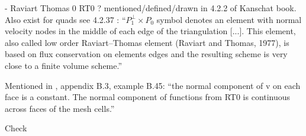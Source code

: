 
- Raviart Thomas 0 RT0 \cite{rath77} ? mentioned/defined/drawn in 4.2.2 of 
Kanschat book. Also exist for quads see 4.2.37 
\textcite{hald03}: ``$P_1^\perp \times P_0$ symbol denotes an element with 
normal velocity nodes in the middle of each edge of the
triangulation [...]. This element, also called low order Raviart–Thomas element 
(Raviart and Thomas, 1977), is based on flux conservation on elements edges and 
the resulting scheme is very close to a finite volume scheme.''

Mentioned in \textcite{john16}, appendix B.3, example B.45: ``the normal component of v 
on each face is a constant. The normal component of functions from RT0 is
continuous across faces of the mesh cells.''

Check \textcite{brfo}
